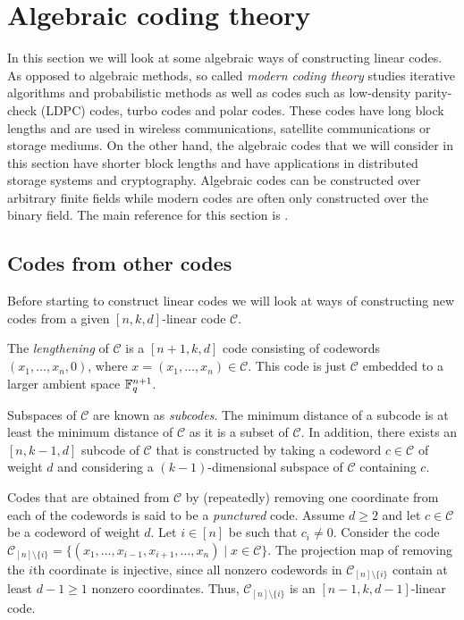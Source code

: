 \documentclass[../main.tex]{subfiles}
\begin{document}
\section{Algebraic coding theory}

In this section we will look at some algebraic ways of constructing linear codes. As opposed to algebraic methods, so called \emph{modern coding theory} studies iterative algorithms and probabilistic methods as well as codes such as low-density parity-check (LDPC) codes, turbo codes and polar codes. These codes have long block lengths and are used in wireless communications, satellite communications or storage mediums. On the other hand, the algebraic codes that we will consider in this section have shorter block lengths and have applications in distributed storage systems and cryptography. Algebraic codes can be constructed over arbitrary finite fields while modern codes are often only constructed over the binary field. The main reference for this section is \cite[Chapters 6 and 7]{ling2004coding}.

\subsection{Codes from other codes}

Before starting to construct linear codes we will look at ways of constructing new codes from a given $[n, k, d]$-linear code $\mathcal{C}$.

The \emph{lengthening} of $\mathcal{C}$ is a $[n + 1, k, d]$ code consisting of codewords $(x_1, \dots, x_n, 0)$, where $x = (x_1, \dots, x_n) \in \mathcal{C}$. This code is just $\mathcal{C}$ embedded to a larger ambient space $\mathbb{F}_q^{n+1}$.

Subspaces of $\mathcal{C}$ are known as \emph{subcodes}. The minimum distance of a subcode is at least the minimum distance of $\mathcal{C}$ as it is a subset of $\mathcal{C}$. In addition, there exists an $[n, k - 1, d]$ subcode of $\mathcal{C}$ that is constructed by taking a codeword $c \in \mathcal{C}$ of weight $d$ and considering a $(k - 1)$-dimensional subspace of $\mathcal{C}$ containing $c$.

Codes that are obtained from $\mathcal{C}$ by (repeatedly) removing one coordinate from each of the codewords is said to be a \emph{punctured} code. Assume $d \geq 2$ and let $c \in \mathcal{C}$ be a codeword of weight $d$. Let $i \in [n]$ be such that $c_i \neq 0$. Consider the code $\mathcal{C}_{[n] \setminus \{i\}} = \{ (x_1, \dots, x_{i-1}, x_{i+1}, \dots, x_n) \mid x \in \mathcal{C} \}$. The projection map of removing the $i$th coordinate is injective, since all nonzero codewords in $\mathcal{C}_{[n] \setminus \{i\}}$ contain at least $d - 1 \geq 1$ nonzero coordinates. Thus, $\mathcal{C}_{[n] \setminus \{i\}}$ is an $[n - 1, k, d - 1]$-linear code.
\end{document}
